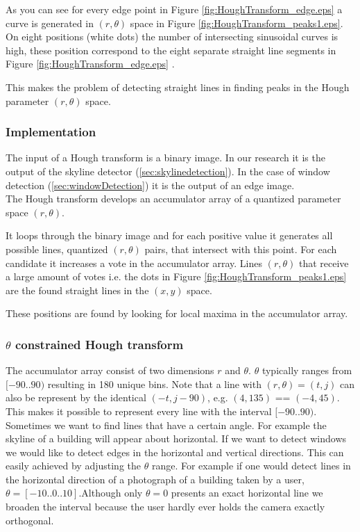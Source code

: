 	 
	 As you can see for every edge point 
	 in Figure \ref{fig:HoughTransform_edge.eps} 
	 a curve is generated in $(r,\theta)$ space in Figure 
\ref{fig:HoughTransform_peaks1.eps}.
	 On eight positions (white dots) the number of intersecting sinusoidal
	 curves is high, these position correspond to the eight separate straight
	 line segments in Figure \ref{fig:HoughTransform_edge.eps} .
	
	This makes the problem of detecting straight lines in finding peaks in the 
	Hough parameter $(r,\theta)$ space.

\subsubsection{Implementation}
	The input of a Hough transform is a binary image. In our research it is the output of 
	the skyline detector (\ref{sec:skylinedetection}). In the case of window
	detection (\ref{sec:windowDetection}) it is the output of an edge image.\\

	The Hough transform develops an accumulator array of a quantized parameter space $(r, \theta)$.

	It loops through the binary image and for each positive value 
	it generates all possible lines, quantized $(r, \theta)$ pairs, that intersect with this point.
	For each candidate it increases a vote in the accumulator array.
	Lines $(r, \theta)$ that receive a large amount of votes
	i.e. the dots in Figure \ref{fig:HoughTransform_peaks1.eps} are the found straight lines in the $(x,y)$ space.

	These positions are found by looking for local maxima in the accumulator array.

\subsubsection{$\theta$ constrained Hough transform}
The accumulator array consist of two dimensions $r$ and $\theta$.
$\theta$ typically ranges from $[-90..90)$ resulting in 180 unique bins.
Note that a line with $(r, \theta) = (t,j)$ can also be represent by the identical $(-t, j-90)$, e.g. $(4, 135)$ == $(-4, 45)$.
This makes it possible to represent every line with the interval $[-90..90)$.\\

Sometimes we want to find lines that have a certain angle.
For example the skyline of a building will appear about horizontal. If we
want to detect windows we would like to detect edges in the horizontal and vertical directions.
This can easily achieved by adjusting the $\theta$ range.
For example if one would detect lines in the horizontal direction of
a photograph of a building taken by a user, $\theta = [-10..0..10]$.Although
only $\theta = 0$ presents an exact horizontal line we broaden the interval
because the user hardly ever holds the camera exactly orthogonal.
	
